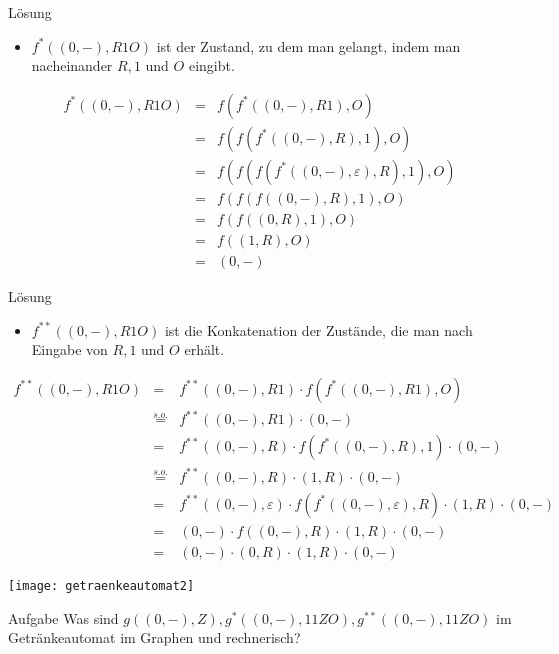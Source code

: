 \begin{frame}
	\begin{exampleblock}{Lösung}
		\begin{itemize}
			\item $f^*((0,-),R1O)$ ist der Zustand, zu dem man gelangt, indem man nacheinander $R, 1$ und $O$ eingibt.
		\end{itemize}
		\begin{eqnarray*}
			f^*((0,-),R1O)&=&f(f^*((0,-),R1),O)\\
						&=&f(f(f^*((0,-),R),1),O)\\
						&=&f(f(f(f^*((0,-),\varepsilon),R),1),O)\\
						&=&f(f(f((0,-),R),1),O)\\
						&=&f(f((0,R),1),O)\\
						&=&f((1,R),O)\\
						&=&(0,-)
		\end{eqnarray*}

	\end{exampleblock}
\end{frame}
\begin{frame}
	\begin{exampleblock}{Lösung}
		\begin{itemize}
			\item $f^{**}((0,-),R1O)$ ist die Konkatenation der Zustände, die man nach Eingabe von $R, 1$ und $O$ erhält.
		\end{itemize}
		\begin{eqnarray*}
			f^{**}((0,-),R1O)&=&f^{**}((0,-),R1)\cdot f(f^*((0,-),R1),O)\\
						&\overset{s.o.}{=}&f^{**}((0,-),R1)\cdot (0,-)\\
						&=&f^{**}((0,-),R)\cdot f(f^*((0,-),R),1)\cdot (0,-)\\
						&\overset{s.o.}{=}&f^{**}((0,-),R)\cdot (1,R)\cdot (0,-)\\
						&=&f^{**}((0,-),\varepsilon)\cdot f(f^*((0,-),\varepsilon),R)\cdot (1,R)\cdot (0,-)\\
						&=&(0,-)\cdot f((0,-),R)\cdot (1,R)\cdot (0,-)\\
						&=&(0,-)\cdot (0,R)\cdot (1,R)\cdot (0,-)
		\end{eqnarray*}

	\end{exampleblock}
\end{frame}

\begin{frame}
	\begin{center}
		\texttt{[image: getraenkeautomat2]}
	\end{center}

	\begin{block}{Aufgabe}
		Was sind $g((0,-),Z),g^*((0,-),11ZO),g^{**}((0,-),11ZO)$ im Getränkeautomat im Graphen und rechnerisch?
	\end{block}
\end{frame}

